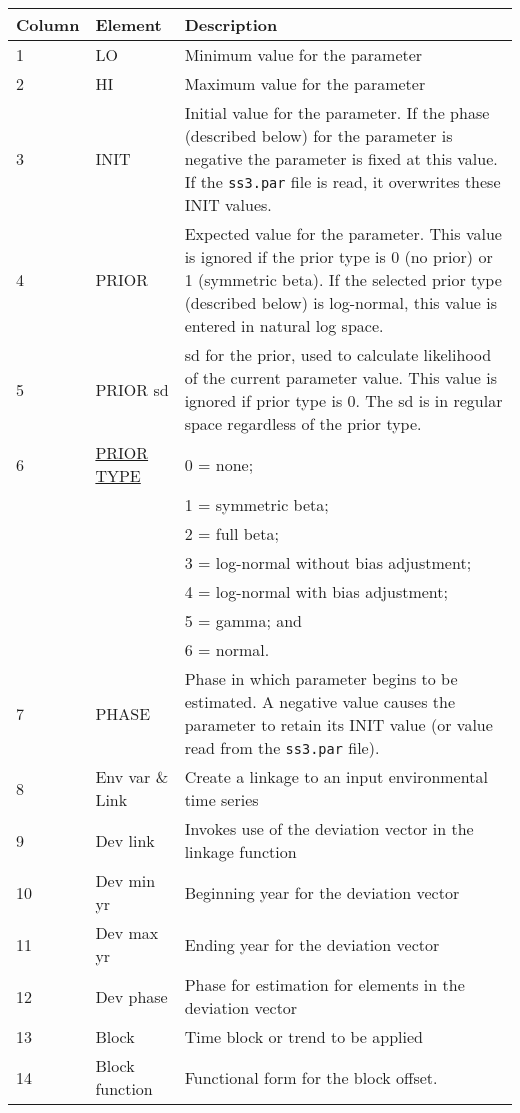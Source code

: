 \hypertarget{Priors}{} \hypertarget{paraOrder}{}
\begin{center}
	\begin{tabular}{p{2cm} p{3cm} p{10cm}}
		\hline
		Column & Element & Description \Tstrut\Bstrut\\
		\hline
		1 & LO & Minimum value for the parameter \Tstrut\\
		2 & HI & Maximum value for the parameter \Tstrut\\
		3 \Tstrut & INIT & Initial value for the parameter. If the phase (described below) for the parameter is negative the parameter is fixed at this value. If the \texttt{ss3.par} file is read, it overwrites these INIT values.\\
		4 \Tstrut & PRIOR & Expected value for the parameter. This value is ignored if the prior type is 0 (no prior) or 1 (symmetric beta). If the selected prior type (described below) is log-normal, this value is entered in natural log space. \\
		5 \Tstrut & PRIOR \gls{sd} & \gls{sd} for the prior, used to calculate likelihood of the current parameter value. This value is ignored if prior type is 0. The \gls{sd} is in regular space regardless of the prior type. \\
		6 \Tstrut & \hyperlink{PriorDescrip}{PRIOR TYPE} & 0 = none; \\
		& & 1 = symmetric beta; \\
		& & 2 = full beta; \\
		& & 3 = log-normal without bias adjustment; \\
		& & 4 = log-normal with bias adjustment; \\
		& & 5 = gamma; and \\
		& & 6 = normal. \\
		7 \Tstrut & PHASE & Phase in which parameter begins to be estimated. A negative value causes the parameter to retain its INIT value (or value read from the \texttt{ss3.par} file). \Bstrut\\
		8 \Tstrut & Env var \& Link & Create a linkage to an input environmental time series \\
		9 \Tstrut & Dev link & Invokes use of the deviation vector in the linkage function \\
		10 \Tstrut & Dev min yr & Beginning year for the deviation vector \\
		11 \Tstrut & Dev max yr & Ending year for the deviation vector \\
		12 \Tstrut & Dev phase & Phase for estimation for elements in the deviation vector \\
		13 \Tstrut & Block & Time block or trend to be applied \\
		14 \Tstrut & Block function & Functional form for the block offset. \Bstrut\\
		\hline
	\end{tabular}
\end{center}

